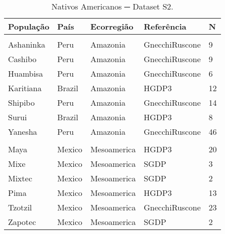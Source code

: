 \begin{table}[htbp!]
\centering


\begin{tabular}[htb!]{m{3.5cm}m{2cm}m{3cm}m{3cm}R}

\toprule
População & País & Ecorregião & Referência & N\\
\midrule
\addlinespace[0.3em]
\\
\midrule
\addlinespace[0.3em]
Ashaninka & Peru & Amazonia & GnecchiRuscone & 9\\
Cashibo & Peru & Amazonia & GnecchiRuscone & 9\\
Huambisa & Peru & Amazonia & GnecchiRuscone & 6\\
Karitiana & Brazil & Amazonia & HGDP3 & 12\\
Shipibo & Peru & Amazonia & GnecchiRuscone & 14\\
Surui & Brazil & Amazonia & HGDP3 & 8\\
Yanesha & Peru & Amazonia & GnecchiRuscone & 46\\
\addlinespace[0.3em]

\midrule
{}\\
\midrule
\addlinespace[0.3em]
Maya & Mexico & Mesoamerica & HGDP3 & 20\\
Mixe & Mexico & Mesoamerica & SGDP & 3\\
Mixtec & Mexico & Mesoamerica & SGDP & 2\\
Pima & Mexico & Mesoamerica & HGDP3 & 13\\
Tzotzil & Mexico & Mesoamerica & GnecchiRuscone & 23\\
Zapotec & Mexico & Mesoamerica & SGDP & 2\\
\bottomrule

\end{tabular}

\caption{Nativos Americanos ─ Dataset S2.}
\label{tab:ds2_natives}

\vspace{\onelineskip}

\end{table}

